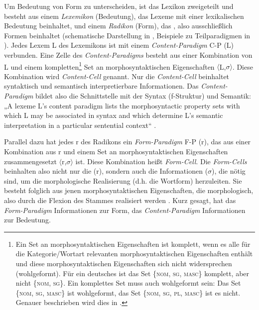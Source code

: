 Um Bedeutung von Form zu unterscheiden, ist das Lexikon zweigeteilt und besteht aus einem \textit{Lexemikon} (Bedeutung), das Lexeme mit einer lexikalischen Bedeutung beinhaltet, und einem \textit{Radikon} (Form), das , also ausschließlich Formen beinhaltet (schematische Darstellung in , Beispiele zu Teilparadigmen in ). Jedes Lexem L des Lexemikons ist mit einem \textit{Content-Paradigm} C-P (L) verbunden. Eine Zelle des \textit{Content-Paradigms} besteht aus einer Kombination von L und einem kompletten\footnote{Ein Set an morphosyntaktischen Eigenschaften ist komplett, wenn es alle für die Kategorie/Wortart relevanten morphosyntaktischen Eigenschaften enthält und diese morphosyntaktischen Eigenschaften sich nicht widersprechen (wohlgeformt). Für ein deutsches  ist das Set \{\textsc{nom}, \textsc{sg}, \textsc{masc}\} komplett, aber nicht \{\textsc{nom}, \textsc{sg}\}. Ein komplettes Set muss auch wohlgeformt sein: Das Set \{\textsc{nom}, \textsc{sg}, \textsc{masc}\} ist wohlgeformt, das Set \{\textsc{nom}, \textsc{sg}, \textsc{pl}, \textsc{masc}\} ist es nicht. Genauer beschrieben wird dies in .} Set an morphosyntaktischen Eigenschaften $\langle$L,$\sigma$$\rangle$. Diese Kombination wird \textit{Content-Cell} genannt. Nur die \textit{Content-Cell} beinhaltet syntaktisch und semantisch interpretierbare Informationen. Das \textit{Content-Paradigm} bildet also die Schnittstelle mit der Syntax (f-Struk\-tur) und Semantik: „A lexeme L’s content paradigm lists the morphosyntactic property sets with which L may be associated in syntax and which determine L’s semantic interpretation in a particular sentential context“ \citep[104]{Stump2016}.

Parallel dazu hat jedes r des Radikons ein \textit{Form-Paradigm} F-P (r), das aus einer Kombination aus r und einem Set an morphosyntaktischen Eigenschaften zusammengesetzt $\langle$r,$\sigma$$\rangle$ ist. Diese Kombination heißt \textit{Form-Cell}. Die \textit{Form-Cells} beinhalten also nicht nur die  (r), sondern auch die Informationen ($\sigma $), die nötig sind, um die morphologische Realisierung (d.h. die Wortform) herzuleiten. Sie besteht folglich aus jenen morphosyntaktischen Eigenschaften, die morphologisch, also durch die Flexion des Stammes realisiert werden \citep[104]{Stump2016}. Kurz gesagt, hat das \textit{Form-Paradigm} Informationen zur Form, das \textit{Content-Paradigm} Informationen zur Bedeutung.

